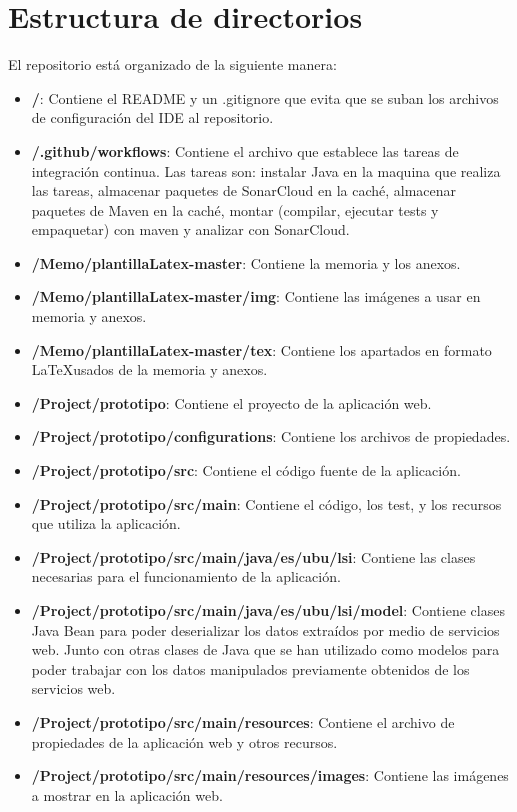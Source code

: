 \section{Estructura de directorios}
El repositorio está organizado de la siguiente manera:
\begin{itemize}
	\item \textbf{/}: Contiene el README y un .gitignore que evita que se suban los archivos de configuración del IDE al repositorio.
	\item \textbf{/.github/workflows}: Contiene el archivo que establece las tareas de integración continua.
	Las tareas son: instalar Java en la maquina que realiza las tareas, almacenar paquetes de SonarCloud en la caché, almacenar paquetes de Maven en la caché, montar (compilar, ejecutar tests y empaquetar) con maven y analizar con SonarCloud.
	\item \textbf{/Memo/plantillaLatex-master}: Contiene la memoria y los anexos.
	\item \textbf{/Memo/plantillaLatex-master/img}: Contiene las imágenes a usar en memoria y anexos.
	\item \textbf{/Memo/plantillaLatex-master/tex}: Contiene los apartados en formato \LaTeX usados de la memoria y anexos.
	\item \textbf{/Project/prototipo}: Contiene el proyecto de la aplicación web.
	\item \textbf{/Project/prototipo/configurations}: Contiene los archivos de propiedades.
	\item \textbf{/Project/prototipo/src}: Contiene el código fuente de la aplicación.
	\item \textbf{/Project/prototipo/src/main}: Contiene el código, los test, y los recursos que utiliza la aplicación.
	\item \textbf{/Project/prototipo/src/main/java/es/ubu/lsi}: Contiene las clases necesarias para el funcionamiento de la aplicación.
	\item \textbf{/Project/prototipo/src/main/java/es/ubu/lsi/model}: Contiene clases Java Bean para poder deserializar los datos extraídos por medio de servicios web. Junto con otras clases de Java que se han utilizado como modelos para poder trabajar con los datos manipulados previamente obtenidos de los servicios web.
	\item \textbf{/Project/prototipo/src/main/resources}: Contiene el archivo de propiedades de la aplicación web y otros recursos.
	\item \textbf{/Project/prototipo/src/main/resources/images}: Contiene las imágenes a mostrar en la aplicación web.

\end{itemize}
